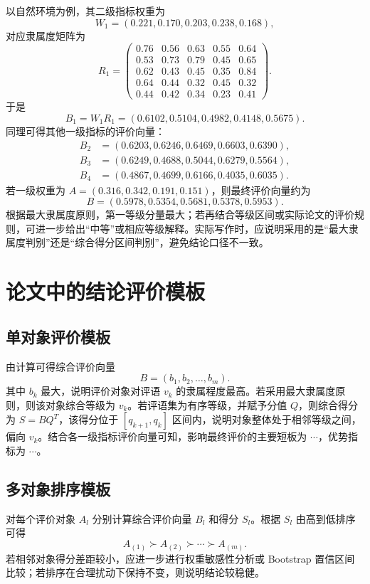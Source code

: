 \documentclass[UTF8,zihao=-4,fontset=none]{ctexart}
\begin{document}
以自然环境为例，其二级指标权重为
\begin{equation}
W_1=(0.221,0.170,0.203,0.238,0.168),
\end{equation}
对应隶属度矩阵为
\begin{equation}
R_1=\begin{pmatrix}
0.76&0.56&0.63&0.55&0.64\\
0.53&0.73&0.79&0.45&0.65\\
0.62&0.43&0.45&0.35&0.84\\
0.64&0.44&0.32&0.45&0.32\\
0.44&0.42&0.34&0.23&0.41
\end{pmatrix}.
\end{equation}
于是
\begin{equation}
B_1=W_1R_1=(0.6102,0.5104,0.4982,0.4148,0.5675).
\end{equation}
同理可得其他一级指标的评价向量：
\begin{align}
B_2&=(0.6203,0.6246,0.6469,0.6603,0.6390),\\
B_3&=(0.6249,0.4688,0.5044,0.6279,0.5564),\\
B_4&=(0.4867,0.4699,0.6166,0.4035,0.6035).
\end{align}
若一级权重为 $A=(0.316,0.342,0.191,0.151)$，则最终评价向量约为
\begin{equation}
B=(0.5978,0.5354,0.5681,0.5378,0.5953).
\end{equation}
根据最大隶属度原则，第一等级分量最大；若再结合等级区间或实际论文的评价规则，可进一步给出“中等”或相应等级解释。实际写作时，应说明采用的是“最大隶属度判别”还是“综合得分区间判别”，避免结论口径不一致。

\section{论文中的结论评价模板}
\subsection{单对象评价模板}
由计算可得综合评价向量
\begin{equation}
  B=(b_1,b_2,\ldots,b_m).
\end{equation}
其中 $b_k$ 最大，说明评价对象对评语 $v_k$ 的隶属程度最高。若采用最大隶属度原则，则该对象综合等级为 $v_k$。若评语集为有序等级，并赋予分值 $Q$，则综合得分为 $S=BQ^T$，该得分位于 $[q_{k+1},q_k]$ 区间内，说明对象整体处于相邻等级之间，偏向 $v_k$。结合各一级指标评价向量可知，影响最终评价的主要短板为 $\cdots$，优势指标为 $\cdots$。

\subsection{多对象排序模板}
对每个评价对象 $A_l$ 分别计算综合评价向量 $B_l$ 和得分 $S_l$。根据 $S_l$ 由高到低排序可得
\begin{equation}
  A_{(1)}\succ A_{(2)}\succ \cdots \succ A_{(m)}.
\end{equation}
若相邻对象得分差距较小，应进一步进行权重敏感性分析或 Bootstrap 置信区间比较；若排序在合理扰动下保持不变，则说明结论较稳健。
\end{document}
